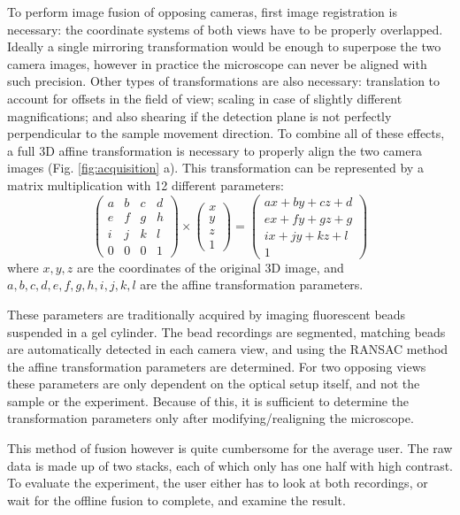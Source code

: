 To perform image fusion of opposing cameras, first image registration is necessary: the coordinate systems of both views have to be properly overlapped. Ideally a single mirroring transformation would be enough to superpose the two camera images, however in practice the microscope can never be aligned with such precision. Other types of transformations are also necessary: translation to account for offsets in the field of view; scaling in case of slightly different magnifications; and also shearing if the detection plane is not perfectly perpendicular to the sample movement direction. To combine all of these effects, a full 3D affine transformation is necessary to properly align the two camera images (Fig. \ref{fig:acquisition} a). This transformation can be represented by a matrix multiplication with 12 different parameters:
\[
\begin{pmatrix}
a & b & c & d \\ 
e & f & g & h \\ 
i & j & k & l \\
0 & 0 & 0 & 1 
\end{pmatrix}
\times
\begin{pmatrix}
x\\
y\\
z\\
1
\end{pmatrix}
=
\begin{pmatrix}
a x + b y + c z + d\\ 
e x + f y + g z + g\\ 
i x + j y + k z + l\\
1
\end{pmatrix}
\]
where $x, y, z$ are the coordinates of the original 3D image, and $a, b, c, d, e, f, g, h, i, j, k, l$ are the affine transformation parameters.

These parameters are traditionally acquired by imaging fluorescent beads suspended in a gel cylinder. The bead recordings are segmented, matching beads are automatically detected in each camera view, and using the RANSAC method the affine transformation parameters are determined. For two opposing views these parameters are only dependent on the optical setup itself, and not the sample or the experiment. Because of this, it is sufficient to determine the transformation parameters only after modifying/realigning the microscope.

This method of fusion however is quite cumbersome for the average user. The raw data is made up of two stacks, each of which only has one half with high contrast.
To evaluate the experiment, the user either has to look at both recordings, or wait for the offline fusion to complete, and examine the result.


